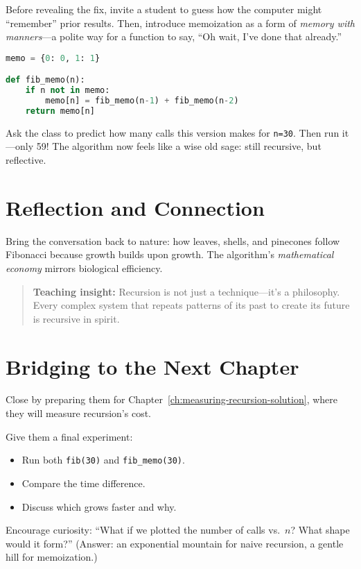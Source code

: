 Before revealing the fix, invite a student to guess how the computer might
“remember” prior results.  Then, introduce memoization as a form of
\emph{memory with manners}—a polite way for a function to say, “Oh wait, I’ve
done that already.”

\begin{lstlisting}[language=Python,caption={Memoized Fibonacci}]
memo = {0: 0, 1: 1}

def fib_memo(n):
    if n not in memo:
        memo[n] = fib_memo(n-1) + fib_memo(n-2)
    return memo[n]
\end{lstlisting}

Ask the class to predict how many calls this version makes for \texttt{n=30}.
Then run it—only 59!  The algorithm now feels like a wise old sage: still
recursive, but reflective.

\section{Reflection and Connection}

Bring the conversation back to nature: how leaves, shells, and pinecones follow
Fibonacci because growth builds upon growth.  The algorithm’s
\emph{mathematical economy} mirrors biological efficiency.

\begin{quote}
\textbf{Teaching insight:}
Recursion is not just a technique—it’s a philosophy.
Every complex system that repeats patterns of its past to create its future is
recursive in spirit.
\end{quote}

\section{Bridging to the Next Chapter}

Close by preparing them for Chapter~\ref{ch:measuring-recursion-solution},
where they will measure recursion’s cost.

Give them a final experiment:
\begin{itemize}
  \item Run both \texttt{fib(30)} and \texttt{fib\_memo(30)}.
  \item Compare the time difference.
  \item Discuss which grows faster and why.
\end{itemize}

Encourage curiosity: “What if we plotted the number of calls vs.~$n$?  What
shape would it form?”  (Answer: an exponential mountain for naive recursion, a
gentle hill for memoization.)

